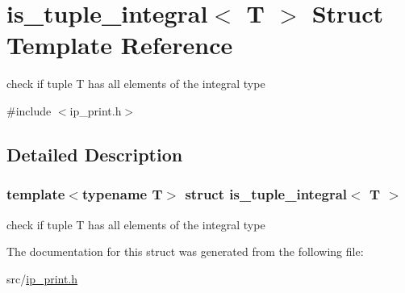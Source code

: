\hypertarget{structis__tuple__integral}{}\section{is\+\_\+tuple\+\_\+integral$<$ T $>$ Struct Template Reference}
\label{structis__tuple__integral}


check if tuple T has all elements of the integral type  




{\ttfamily \#include $<$ip\+\_\+print.\+h$>$}



\subsection{Detailed Description}
\subsubsection*{template$<$typename T$>$\newline
struct is\+\_\+tuple\+\_\+integral$<$ T $>$}

check if tuple T has all elements of the integral type 

The documentation for this struct was generated from the following file\+:\begin{DoxyCompactItemize}
\item 
src/\hyperlink{ip__print_8h}{ip\+\_\+print.\+h}\end{DoxyCompactItemize}
